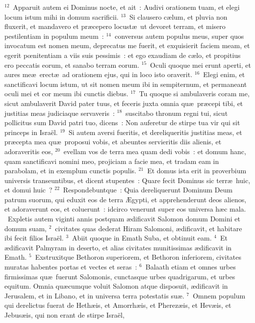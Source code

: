 ${}^{12}$~Apparuit autem ei Dominus nocte, et ait~: Audivi orationem tuam, et elegi locum istum mihi in domum sacrificii.
${}^{13}$~Si clausero c\ae lum, et pluvia non fluxerit, et mandavero et pr\ae cepero locust\ae\ ut devoret terram, et misero pestilentiam in populum meum~:
${}^{14}$~conversus autem populus meus, super quos invocatum est nomen meum, deprecatus me fuerit, et exquisierit faciem meam, et egerit pœnitentiam a viis suis pessimis~: et ego exaudiam de c\ae lo, et propitius ero peccatis eorum, et sanabo terram eorum.
${}^{15}$~Oculi quoque mei erunt aperti, et aures me\ae\ erect\ae\ ad orationem ejus, qui in loco isto oraverit.
${}^{16}$~Elegi enim, et sanctificavi locum istum, ut sit nomen meum ibi in sempiternum, et permaneant oculi mei et cor meum ibi cunctis diebus.
${}^{17}$~Tu quoque si ambulaveris coram me, sicut ambulaverit David pater tuus, et feceris juxta omnia qu\ae\ pr\ae cepi tibi, et justitias meas judiciaque servaveris~:
${}^{18}$~suscitabo thronum regni tui, sicut pollicitus sum David patri tuo, dicens~: Non auferetur de stirpe tua vir qui sit princeps in Isra\"el.
${}^{19}$~Si autem aversi fueritis, et dereliqueritis justitias meas, et pr\ae cepta mea qu\ae\ proposui vobis, et abeuntes servieritis diis alienis, et adoraveritis eos,
${}^{20}$~evellam vos de terra mea quam dedi vobis~: et domum hanc, quam sanctificavi nomini meo, projiciam a facie mea, et tradam eam in parabolam, et in exemplum cunctis populis.
${}^{21}$~Et domus ista erit in proverbium universis transeuntibus, et dicent stupentes~: Quare fecit Dominus sic terr\ae\ huic, et domui huic~?
${}^{22}$~Respondebuntque~: Quia dereliquerunt Dominum Deum patrum suorum, qui eduxit eos de terra \AE gypti, et apprehenderunt deos alienos, et adoraverunt eos, et coluerunt~: idcirco venerunt super eos universa h\ae c mala.
~Expletis autem viginti annis postquam \ae dificavit Salomon domum Domini et domum suam,
${}^{2}$~civitates quas dederat Hiram Salomoni, \ae dificavit, et habitare ibi fecit filios Isra\"el.
${}^{3}$~Abiit quoque in Emath Suba, et obtinuit eam.
${}^{4}$~Et \ae dificavit Palmyram in deserto, et alias civitates munitissimas \ae dificavit in Emath.
${}^{5}$~Exstruxitque Bethoron superiorem, et Bethoron inferiorem, civitates muratas habentes portas et vectes et seras~:
${}^{6}$~Balaath etiam et omnes urbes firmissimas qu\ae\ fuerunt Salomonis, cunctasque urbes quadrigarum, et urbes equitum. Omnia qu\ae cumque voluit Salomon atque disposuit, \ae dificavit in Jerusalem, et in Libano, et in universa terra potestatis su\ae .
${}^{7}$~Omnem populum qui derelictus fuerat de Heth\ae is, et Amorrh\ae is, et Pherez\ae is, et Hev\ae is, et Jebus\ae is, qui non erant de stirpe Isra\"el,

